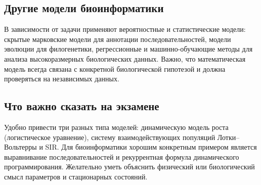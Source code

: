 \subsection{Другие модели биоинформатики}

В зависимости от задачи применяют вероятностные и статистические модели:
скрытые марковские модели для аннотации последовательностей, модели
эволюции для филогенетики, регрессионные и машинно-обучающие методы для
анализа высокоразмерных биологических данных. Важно, что математическая
модель всегда связана с конкретной биологической гипотезой и должна
проверяться на независимых данных.

\subsection{Что важно сказать на экзамене}

Удобно привести три разных типа моделей: динамическую модель роста
(логистическое уравнение), систему взаимодействующих популяций
Лотки--Вольтерры и SIR. Для биоинформатики хорошим конкретным примером
является выравнивание последовательностей и рекуррентная формула
динамического программирования. Желательно уметь объяснить физический или
биологический смысл параметров и стационарных состояний.

\newpage
